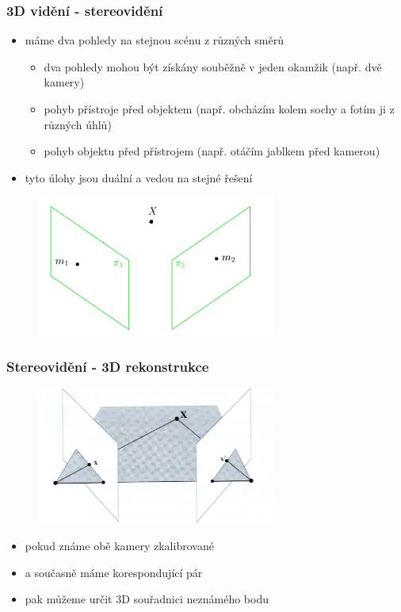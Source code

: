\begin{frame}
\frametitle{3D vidění - stereovidění}
\begin{itemize}
\item máme dva pohledy na stejnou scénu z různých směrů
\begin{itemize}
\item dva pohledy mohou být získány souběžně v jeden okamžik (např. dvě kamery)
\item pohyb přístroje před objektem (např. obcházím kolem sochy a fotím ji z různých úhlů)
\item pohyb objektu před přístrojem (např. otáčím jablkem před kamerou)
\end{itemize}
\item tyto úlohy jsou duální a vedou na stejné řešení
\end{itemize}
\begin{figure}[h]
\centering
\includegraphics[width=0.7\textwidth]{./epi1c}
\label{fig:epi1}
\end{figure}

\end{frame}

\begin{frame}
\frametitle{Stereovidění - 3D rekonstrukce}

\begin{figure}[h]
\centering
\includegraphics[width=0.7\textwidth]{./epi3}
\label{fig:epi3}
\end{figure}
\begin{itemize}
\item pokud známe obě kamery zkalibrované
\item a současně máme korespondující pár
\item pak můžeme určit 3D souřadnici neznámého bodu
\end{itemize}
\end{frame}


